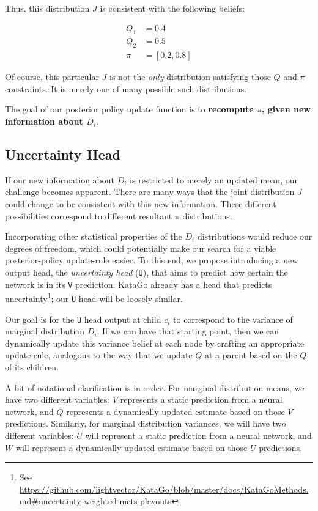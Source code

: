 \documentclass[tikz]{article}
\begin{document}
Thus, this distribution $J$ is consistent with the following beliefs:

\begin{align*}
Q_1 &= 0.4 \\
Q_2 &= 0.5 \\
\pi &= [0.2, 0.8]
\end{align*}

Of course, this particular $J$ is not the \emph{only} distribution satisfying those $Q$ and $\pi$ constraints. It is merely one of
many possible such distributions. \newline

The goal of our posterior policy update function is to \textbf{recompute $\pi$, given new information about $D_i$}.

\subsection{Uncertainty Head}

If our new information about $D_i$ is restricted to merely an updated mean, our challenge becomes apparent. There are many ways that the joint 
distribution $J$ could change to be consistent with this new information. These different possibilities correspond to different
resultant $\pi$ distributions. \newline

Incorporating other statistical properties of the $D_i$ distributions would reduce our degrees of freedom, which could potentially
make our search for a viable posterior-policy update-rule easier. To this end, we propose introducing a new output head, the \emph{uncertainty head} (\texttt{U}),
that aims to predict how certain the network is in its \texttt{V} prediction. KataGo already has a head that predicts uncertainty\footnote{See \url{https://github.com/lightvector/KataGo/blob/master/docs/KataGoMethods.md\#uncertainty-weighted-mcts-playouts}}; our \texttt{U} head will be loosely
similar. \newline

Our goal is for the \texttt{U} head output at child $c_i$ to correspond to the variance of marginal distribution $D_i$. If we can have
that starting point, then we can dynamically update this variance belief at each node by crafting an appropriate update-rule, analogous
to the way that we update $Q$ at a parent based on the $Q$ of its children. \newline

A bit of notational clarification is in order. For marginal distribution means, we have two different variables: $V$ represents a static prediction
from a neural network, and $Q$ represents a dynamically updated estimate based on those $V$ predictions. Similarly, for marginal distribution
variances, we will have two different variables: $U$ will represent a static prediction from a neural network, and $W$ will represent
a dynamically updated estimate based on those $U$ predictions. \newline
\end{document}
